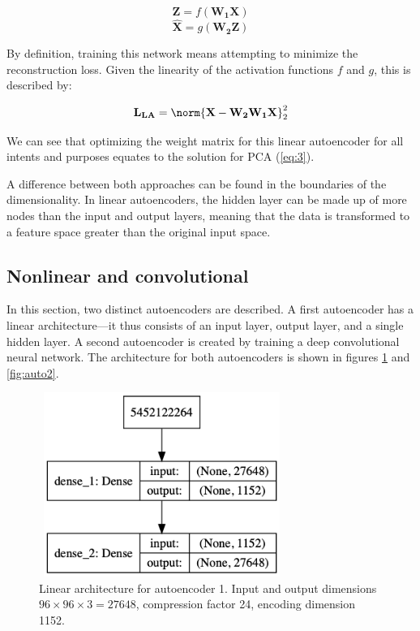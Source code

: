 \begin{equation} \label{eq:4}
	\mathbf{Z} = f(\mathbf{W_1 X})
\end{equation}
\begin{equation}\label{eq:5}
	\mathbf{\hat{X}} = g(\mathbf{W_2 Z})
\end{equation}

By definition, training this network means attempting to minimize the reconstruction loss.  Given the linearity of the activation functions $f$ and $g$, this is described by:

\begin{equation} \label{eq:6}
	\mathbf{L_{LA}} = \norm{\mathbf{X} - \mathbf{W_2 W_1 X}}_2^2 
\end{equation}

We can see that optimizing the weight matrix for this linear autoencoder for all intents and purposes equates to the solution for PCA (\ref{eq:3}).

A difference between both approaches can be found in the boundaries of the dimensionality. In linear autoencoders, the hidden layer can be made up of more nodes than the input and output layers, meaning that the data is transformed to a feature space greater than the original input space.




\subsection{Nonlinear and convolutional}
\label{sec:auto2}

In this section, two distinct autoencoders are described. A first autoencoder has a linear architecture---it thus consists of an input layer, output layer, and a single hidden layer. A second autoencoder is created by training a deep convolutional neural network. The architecture for both autoencoders is shown in figures \ref{fig:auto1} and \ref{fig:auto2}.

\begin{figure}[!htbp]
	\begin{center}
		\includegraphics[width=8cm, height=6cm, keepaspectratio]{images/auto_lin_architecture}
		\caption{Linear architecture for autoencoder 1. Input and output dimensions $96\times96\times3 = 27648$, compression factor 24, encoding dimension 1152.}
		\label{fig:auto1}
	\end{center}
\end{figure}

